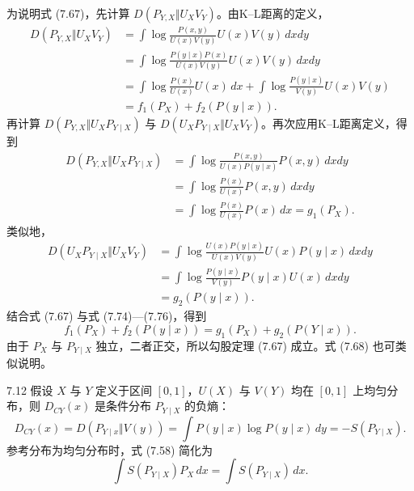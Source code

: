 为说明式 (7.67)，先计算 $D(P_{Y,X}\Vert U_XV_Y)$。由K–L距离的定义，
\begin{equation}
\begin{aligned}
D(P_{Y,X}\Vert U_XV_Y)
&=\int\log\frac{P(x,y)}{U(x)V(y)}U(x)V(y)\,dxdy\\
&=\int\log\frac{P(y\mid x)P(x)}{U(x)V(y)}U(x)V(y)\,dxdy\\
&=\int\log\frac{P(x)}{U(x)}U(x)\,dx
+\int\log\frac{P(y\mid x)}{V(y)}U(x)V(y)\\
&=f_1(P_X)+f_2(P(y\mid x)).
\end{aligned}
\tag{7.74}
\end{equation}
再计算 $D(P_{Y,X}\Vert U_XP_{Y\mid X})$ 与 $D(U_XP_{Y\mid X}\Vert U_XV_Y)$。再次应用K–L距离定义，得到
\begin{equation}
\begin{aligned}
D(P_{Y,X}\Vert U_XP_{Y\mid X})
&=\int\log\frac{P(x,y)}{U(x)P(y\mid x)}P(x,y)\,dxdy\\
&=\int\log\frac{P(x)}{U(x)}P(x,y)\,dxdy\\
&=\int\log\frac{P(x)}{U(x)}P(x)\,dx=g_1(P_X).
\end{aligned}
\tag{7.75}
\end{equation}
类似地，
\begin{equation}
\begin{aligned}
D(U_XP_{Y\mid X}\Vert U_XV_Y)
&=\int\log\frac{U(x)P(y\mid x)}{U(x)V(y)}U(x)P(y\mid x)\,dxdy\\
&=\int\log\frac{P(y\mid x)}{V(y)}P(y\mid x)U(x)\,dxdy\\
&=g_2(P(y\mid x)).
\end{aligned}
\tag{7.76}
\end{equation}
结合式 (7.67) 与式 (7.74)—(7.76)，得到
\begin{equation}
f_1(P_X)+f_2(P(y\mid x))=g_1(P_X)+g_2(P(Y\mid x)).
\tag{7.77}
\end{equation}
由于 $P_X$ 与 $P_{Y\mid X}$ 独立，二者正交，所以勾股定理 (7.67) 成立。式 (7.68) 也可类似说明。

\begin{bookexample}{7.12}
假设 $X$ 与 $Y$ 定义于区间 $[0,1]$，$U(X)$ 与 $V(Y)$ 均在 $[0,1]$ 上均匀分布，则 $D_{CY}(x)$ 是条件分布 $P_{Y\mid X}$ 的负熵：
\begin{equation}
D_{CY}(x)=D(P_{Y\mid x}\Vert V(y))
=\int P(y\mid x)\log P(y\mid x)\,dy=-S(P_{Y\mid X}).
\tag{7.78}
\end{equation}
参考分布为均匀分布时，式 (7.58) 简化为
\begin{equation}
\int S(P_{Y\mid X})P_X\,dx=\int S(P_{Y\mid X})\,dx.
\tag{7.79}
\end{equation}
\end{bookexample}

